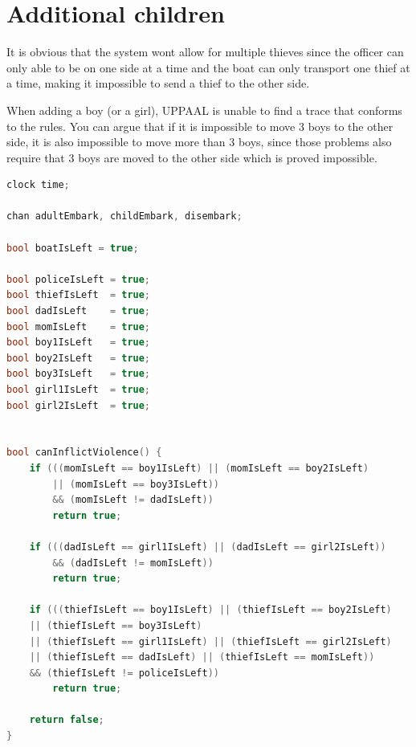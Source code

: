 \documentclass[a4paper,12pt]{scrartcl}
\begin{document}
\section*{Additional children}

It is obvious that the system wont allow for multiple thieves since the officer can only able to be on one side at a time and the boat can only transport one thief at a time, making it impossible to send a thief to the other side.

When adding a boy (or a girl), UPPAAL is unable to find a trace that conforms to the rules. You can argue that if it is impossible to move 3 boys to the other side, it is also impossible to move more than 3 boys, since those problems also require that 3 boys are moved to the other side which is proved impossible.

\begin{lstlisting}[language=CPP, label = lst:plugin_example, caption = Global declarations with an extra boy.]
clock time;

chan adultEmbark, childEmbark, disembark;

bool boatIsLeft = true;

bool policeIsLeft = true;
bool thiefIsLeft  = true;
bool dadIsLeft    = true;
bool momIsLeft    = true;
bool boy1IsLeft   = true;
bool boy2IsLeft   = true;
bool boy3IsLeft   = true;
bool girl1IsLeft  = true;
bool girl2IsLeft  = true;


bool canInflictViolence() {
    if (((momIsLeft == boy1IsLeft) || (momIsLeft == boy2IsLeft)
    	|| (momIsLeft == boy3IsLeft))
    	&& (momIsLeft != dadIsLeft))
        return true;

    if (((dadIsLeft == girl1IsLeft) || (dadIsLeft == girl2IsLeft))
    	&& (dadIsLeft != momIsLeft))
        return true;

    if (((thiefIsLeft == boy1IsLeft) || (thiefIsLeft == boy2IsLeft)
    || (thiefIsLeft == boy3IsLeft)
    || (thiefIsLeft == girl1IsLeft) || (thiefIsLeft == girl2IsLeft)
    || (thiefIsLeft == dadIsLeft) || (thiefIsLeft == momIsLeft))
    && (thiefIsLeft != policeIsLeft))
        return true;

    return false;
}
\end{lstlisting}
\end{document}
